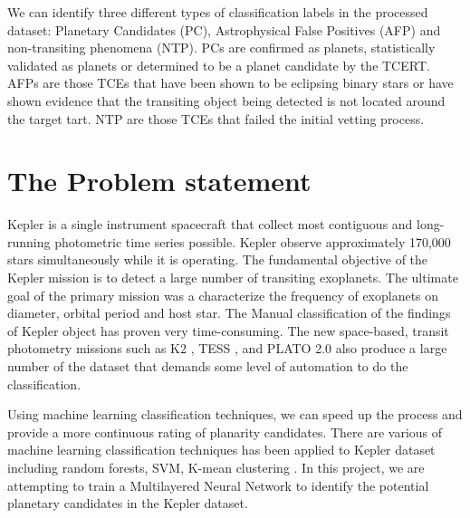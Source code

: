 We can identify three different types of classification labels in the processed dataset: Planetary Candidates (PC), Astrophysical False Positives (AFP) and non-transiting phenomena (NTP). PCs are confirmed as planets, statistically validated as planets or determined to be a planet candidate by the TCERT. AFPs are those TCEs that have been shown to be eclipsing binary stars or have shown evidence that the transiting object being detected is not located around the target tart. NTP are those TCEs that failed the initial vetting process.



\section{The Problem statement}

Kepler is a single instrument spacecraft that collect most contiguous and long-running photometric time series possible. Kepler observe approximately 170,000 stars simultaneously while it is operating. The fundamental objective of the Kepler mission is to detect a large number of transiting exoplanets. The ultimate goal of the primary mission was a characterize the frequency of exoplanets on diameter, orbital period and host star.  The Manual classification of the findings of Kepler object has proven very time-consuming. The new space-based, transit photometry missions such as K2 \cite{2014PASP..126..398H}, TESS \cite{2014SPIE.9143E..20R}, and PLATO 2.0 \cite{2014ExA....38..249R} also produce a large number of the dataset that demands some level of automation to do the classification. 

Using machine learning classification techniques, we can speed up the process and provide a more continuous rating of planarity candidates. There are various of machine learning classification techniques has been applied to Kepler dataset including random forests, SVM, K-mean clustering \cite{2015ApJ...800...99T, 2015ApJ...806....6M}.  In this project, we are attempting to train a Multilayered Neural Network to identify the potential planetary candidates in the Kepler dataset. 


